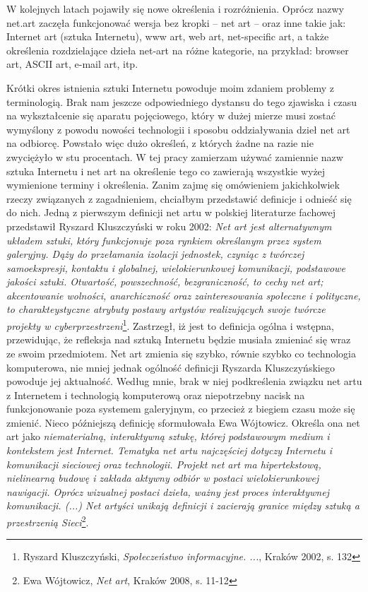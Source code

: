 \documentclass[a4paper,12pt,twoside]{article}
\begin{document}
W kolejnych latach pojawiły się nowe określenia i rozróżnienia.
Oprócz nazwy net.art zaczęła funkcjonować wersja bez kropki -- net art --
oraz inne takie jak: Internet art (sztuka Internetu), www art, web art,
net-specific art, a także określenia rozdzielające dzieła net-art
na różne kategorie, na przykład: browser art, ASCII art, e-mail art, itp.

Krótki okres istnienia sztuki Internetu powoduje moim zdaniem problemy
z terminologią. Brak nam jeszcze odpowiedniego dystansu do tego zjawiska
i czasu na wykształcenie się aparatu pojęciowego, który w dużej mierze
musi zostać wymyślony z powodu nowości technologii i sposobu oddziaływania
dzieł net art na odbiorcę. Powstało więc dużo określeń, z których żadne
na razie nie zwyciężyło w stu procentach.
W tej pracy zamierzam używać zamiennie nazw sztuka Internetu i net art
na określenie tego co zawierają wszystkie wyżej wymienione terminy
i określenia. Zanim zajmę się omówieniem jakichkolwiek rzeczy związanych
z zagadnieniem, chciałbym przedstawić definicje i odnieść się do nich.
Jedną z pierwszym definicji net artu
w polskiej literaturze fachowej przedstawił Ryszard Kluszczyński w roku 2002:
\textit{Net art jest alternatywnym układem sztuki, który funkcjonuje
poza rynkiem określanym przez system galeryjny. Dąży do przełamania
izolacji jednostek, czyniąc z twórczej samoekspresji, kontaktu i globalnej,
wielokierunkowej komunikacji, podstawowe jakości sztuki. Otwartość,
powszechność, bezgraniczność, to cechy net art; akcentowanie wolności,
anarchiczność oraz zainteresowania społeczne i polityczne, to charakteystyczne
atrybuty postawy artystów realizujących swoje twórcze projekty
w cyberprzestrzeni}\footnote{ Ryszard Kluszczyński,
\textit{Społeczeństwo informacyjne. ...}, Kraków 2002, s. 132}.
Zastrzegł, iż jest to definicja ogólna i wstępna, przewidując, że refleksja
nad sztuką Internetu będzie musiała zmieniać się wraz ze swoim przedmiotem.
Net art zmienia się szybko, równie szybko co technologia komputerowa,
nie mniej jednak ogólność definicji Ryszarda Kluszczyńskiego powoduje
jej aktualność. Według mnie, brak w niej podkreślenia związku net artu
z Internetem i technologią komputerową oraz niepotrzebny nacisk na
funkcjonowanie poza systemem galeryjnym, co przecież z biegiem czasu
może się zmienić.
Nieco późniejszą definicję sformułowała Ewa Wójtowicz. Określa ona net art
jako %
\textit{niematerialną, interaktywną sztukę, której podstawowym
medium i kontekstem jest Internet. Tematyka net artu najczęściej dotyczy
Internetu i komunikacji sieciowej oraz technologii. Projekt net art ma
hipertekstową, nielinearną budowę i zakłada aktywny odbiór w postaci
wielokierunkowej nawigacji. Oprócz wizualnej postaci dzieła, ważny jest
proces interaktywnej komunikacji. (...) Net artyści unikają definicji
i zacierają granice między sztuką a przestrzenią
Sieci}\footnote{ Ewa Wójtowicz, \textit{Net art}, Kraków 2008, s. 11-12}.
\end{document}

